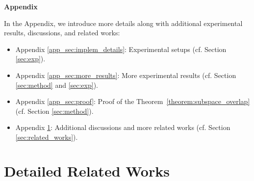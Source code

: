 \newpage
\appendix


\begin{center}
\Large
\textbf{Appendix}
\end{center}



In the Appendix, we introduce more details  along with additional experimental results, discussions, and related works:

\begin{itemize}
\item Appendix \ref{app_sec:implem_details}: Experimental setups (cf. Section \ref{sec:exp}).
\item Appendix \ref{app_sec:more_results}: More experimental results (cf. Section \ref{sec:method} and \ref{sec:exp}).
\item Appendix \ref{app_sec:proof}: Proof of the Theorem~\ref{theorem:subspace_overlap} (cf. Section \ref{sec:method}).
\item Appendix \ref{app_sec:more_related_works}: Additional discussions and more related works (cf. Section \ref{sec:related_works}).
\end{itemize}








\section{Detailed Related Works}\label{app_sec:more_related_works}
